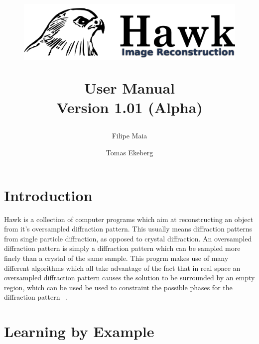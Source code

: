 \documentclass{report}
\begin{document}
\title{
\begin{figure}[!h]
\centering
\includegraphics[width=15cm]{Hawk2.png}
\label{hawk-cover}
\end{figure}
\vspace {1.0in}
{User Manual} \\ Version 1.01 (Alpha) }
\author {Filipe Maia \and Tomas Ekeberg}

\maketitle

\parindent=0pt 
\baselineskip=18pt 
\lineskip=0pt

\tableofcontents

\pagestyle{headings}

\def\delfo{$\delta_{fo}$~}
\def\delfc{$\delta_{fc}$~}
\def\qq{\qquad\qquad}
\def\hbar{\overline{h}}



\chapter{Introduction} 
\label{intro}

\vspace {0.1in}

Hawk is a collection of computer programs which aim at reconstructing an object from 
it's oversampled  diffraction pattern. This usually means diffraction patterns from 
single particle diffraction, as opposed to crystal diffraction. An oversampled diffraction
 pattern is simply a diffraction pattern which can be sampled more finely than a crystal
 of the same sample. This progrm makes use of many different algorithms which all take
 advantage of the fact that in real space an oversampled diffraction pattern causes 
the solution to be surrounded by an empty region, which can be used be used to 
constraint the possible phases for the diffraction pattern ~\cite{Miao2000}.

\chapter{Learning by Example}
\label{tutorial}
\end{document}
